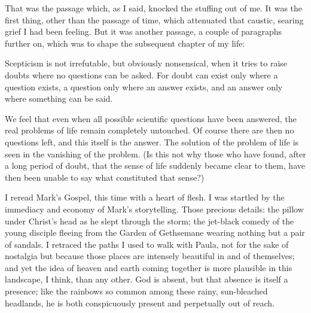 That was the passage which, as I said, knocked the stuffing out of me. It was the first thing, other than the passage of time, which attenuated that caustic, searing grief I had been feeling. But it was another passage, a couple of paragraphs further on, which was to shape the subsequent chapter of my life:

\begin{quoting}
    Scepticism is not irrefutable, but obviously nonsensical, when it tries to raise doubts where no questions can be asked. For doubt can exist only where a question exists, a question only where an answer exists, and an answer only where something can be said.

    We feel that even when all possible scientific questions have been answered, the real problems of life remain completely untouched. Of course there are then no questions left, and this itself is the answer. The solution of the problem of life is seen in the vanishing of the problem. (Is this not why those who have found, after a long period of doubt, that the sense of life suddenly became clear to them, have then been unable to say what constituted that sense?)
\end{quoting}

I reread Mark's Gospel, this time with a heart of flesh. I was startled by the immediacy and economy of Mark's storytelling. Those precious details: the pillow under Christ's head as he slept through the storm; the jet-black comedy of the young disciple fleeing from the Garden of Gethsemane wearing nothing but a pair of sandals. I retraced the paths I used to walk with Paula, not for the sake of nostalgia but because those places are intensely beautiful in and of themselves; and yet the idea of heaven and earth coming together is more plausible in this landscape, I think, than any other. God is absent, but that absence is itself a presence; like the rainbows so common among these rainy, sun-bleached headlands, he is both conspicuously present and perpetually out of reach.
